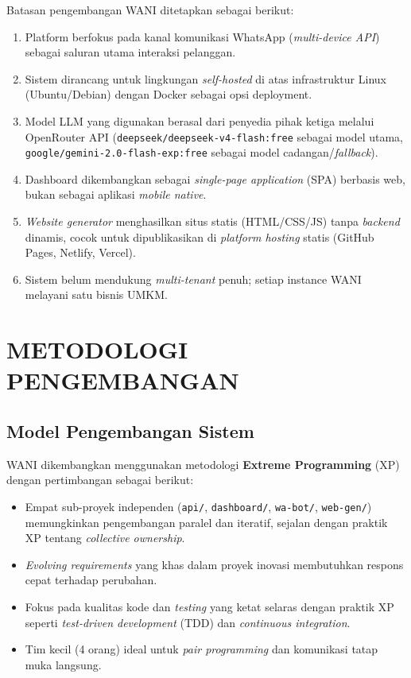 \documentclass[12pt,a4paper,oneside]{article}
\newcommand{\bab}[1]{%
    \newpage
    \section{#1}%
}
\newcommand{\sub}[1]{%
    \subsection{#1}%
}
\begin{document}
Batasan pengembangan WANI ditetapkan sebagai berikut:

\begin{enumerate}
	\item Platform berfokus pada kanal komunikasi WhatsApp (\textit{multi-device API}) sebagai saluran utama interaksi pelanggan.
	\item Sistem dirancang untuk lingkungan \textit{self-hosted} di atas infrastruktur Linux (Ubuntu/Debian) dengan Docker sebagai opsi deployment.
	\item Model LLM yang digunakan berasal dari penyedia pihak ketiga melalui OpenRouter API (\texttt{deepseek/deepseek-v4-flash:free} sebagai model utama, \texttt{google/gemini-2.0-flash-exp:free} sebagai model cadangan/\textit{fallback}).
	\item Dashboard dikembangkan sebagai \textit{single-page application} (SPA) berbasis web, bukan sebagai aplikasi \textit{mobile native}.
	\item \textit{Website generator} menghasilkan situs statis (HTML/CSS/JS) tanpa \textit{backend} dinamis, cocok untuk dipublikasikan di \textit{platform hosting} statis (GitHub Pages, Netlify, Vercel).
	\item Sistem belum mendukung \textit{multi-tenant} penuh; setiap instance WANI melayani satu bisnis UMKM.
\end{enumerate}

\bab{METODOLOGI PENGEMBANGAN}

\sub{Model Pengembangan Sistem}

WANI dikembangkan menggunakan metodologi \textbf{Extreme Programming} (XP) dengan pertimbangan sebagai berikut:

\begin{itemize}
	\item Empat sub-proyek independen (\texttt{api/}, \texttt{dashboard/}, \texttt{wa-bot/}, \texttt{web-gen/}) memungkinkan pengembangan paralel dan iteratif, sejalan dengan praktik XP tentang \textit{collective ownership}.
	\item \textit{Evolving requirements} yang khas dalam proyek inovasi membutuhkan respons cepat terhadap perubahan.
	\item Fokus pada kualitas kode dan \textit{testing} yang ketat selaras dengan praktik XP seperti \textit{test-driven development} (TDD) dan \textit{continuous integration}.
	\item Tim kecil (4 orang) ideal untuk \textit{pair programming} dan komunikasi tatap muka langsung.
\end{itemize}
\end{document}
